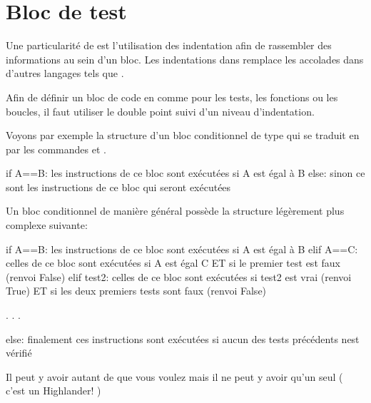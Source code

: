\documentclass[letterpaper,10pt,english]{sphinxmanual}
\begin{document}


\section{Bloc de test}
\label{\detokenize{src/OCI03_Booleans_IfBlock:bloc-de-test}}
Une particularité de  est l’utilisation des indentation afin de rassembler des informations au sein d’un bloc.
Les indentations dans  remplace les accolades \sphinxstylestrong{\{ \}} dans d’autres langages tels que .

Afin de définir un bloc de code en  comme pour les tests, les fonctions ou les boucles, il faut utiliser le double point \sphinxstylestrong{:} suivi d’un niveau d’indentation.

Voyons par exemple la structure d’un bloc conditionnel de type  qui se traduit en  par les commandes  et .

\begin{sphinxVerbatim}[commandchars=\\\{\}]
if A==B:
  \PYGZsh{} les instructions de ce bloc sont exécutées
  \PYGZsh{} si A est égal à B
else:
  \PYGZsh{} sinon ce sont les instructions de ce bloc
  \PYGZsh{} qui seront exécutées
\end{sphinxVerbatim}

Un bloc conditionnel de manière général possède la structure légèrement plus complexe suivante:

\begin{sphinxVerbatim}[commandchars=\\\{\}]
if A==B:
  \PYGZsh{} les instructions de ce bloc sont exécutées
  \PYGZsh{} si A est égal à B
elif A==C:
  \PYGZsh{} celles de ce bloc sont exécutées
  \PYGZsh{} si A est égal C  
  \PYGZsh{} ET si le premier test est faux (renvoi False)
elif test2:
  \PYGZsh{} celles de ce bloc sont exécutées
  \PYGZsh{} si test2 est vrai (renvoi True)  
  \PYGZsh{} ET si les deux premiers tests sont faux (renvoi False)

.
.
.

else:
    \PYGZsh{} finalement ces instructions sont exécutées si 
    \PYGZsh{} aucun des tests précédents n\PYGZsq{}est vérifié
\end{sphinxVerbatim}

Il peut y avoir autant de  que vous voulez mais il ne peut y avoir qu’un seul  ( c’est un Highlander! )
\end{document}
